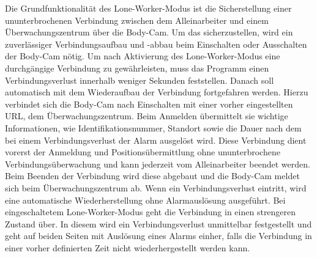 \documentclass[thesis.tex]{subfiles}
\begin{document}
Die Grundfunktionalität des Lone-Worker-Modus ist die Sicherstellung einer ununterbrochenen Verbindung zwischen dem Alleinarbeiter und einem Überwachungszentrum über die Body-Cam.
Um das sicherzustellen, wird ein zuverlässiger Verbindungsaufbau und -abbau beim Einschalten oder Ausschalten der Body-Cam nötig.
Um nach Aktivierung des Lone-Worker-Modus eine durchgängige Verbindung zu gewährleisten, muss das Programm einen Verbindungsverlust innerhalb weniger Sekunden feststellen.
Danach soll automatisch mit dem Wiederaufbau der Verbindung fortgefahren werden.
Hierzu verbindet sich die Body-Cam nach Einschalten mit einer vorher eingestellten URL, dem Überwachungszentrum.
Beim Anmelden übermittelt sie wichtige Informationen, wie Identifikationsnummer, Standort sowie die Dauer nach dem bei einem Verbindungsverlust der Alarm ausgelöst wird.
Diese Verbindung dient vorerst der Anmeldung und Positionsübermittlung ohne ununterbrochene Verbindungsüberwachung und kann jederzeit vom Alleinarbeiter beendet werden.
Beim Beenden der Verbindung wird diese abgebaut und die Body-Cam meldet sich beim Überwachungszentrum ab.
Wenn ein Verbindungsverlust eintritt, wird eine automatische Wiederherstellung ohne Alarmauslösung ausgeführt.
Bei eingeschaltetem Lone-Worker-Modus geht die Verbindung in einen strengeren Zustand über.
In diesem wird ein Verbindungsverlust unmittelbar festgestellt und geht auf beiden Seiten mit Auslösung eines Alarms einher, falls die Verbindung in einer vorher definierten Zeit nicht wiederhergestellt werden kann.
\end{document}
